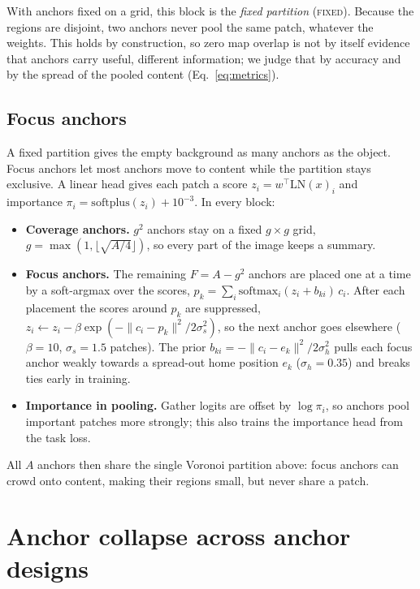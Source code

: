 \documentclass[runningheads]{llncs}
\newcommand{\fixed}{\textsc{fixed}}
\begin{document}
With anchors fixed on a grid, this block is the \emph{fixed partition} (\fixed). Because the
regions are disjoint, two anchors never pool the same patch, whatever the weights. This holds by
construction, so zero map overlap is not by itself evidence that anchors carry useful, different
information; we judge that by accuracy and by the spread of the pooled content (Eq.~\ref{eq:metrics}).

\subsection{Focus anchors}
\label{sec:focus}

A fixed partition gives the empty background as many anchors as the object. Focus anchors let
most anchors move to content while the partition stays exclusive. A linear head gives each patch
a score $z_i=w^{\top}\mathrm{LN}(x)_i$ and importance $\pi_i=\mathrm{softplus}(z_i)+10^{-3}$. In
every block:
\begin{itemize}
\item \textbf{Coverage anchors.} $g^2$ anchors stay on a fixed $g\times g$ grid,
$g=\max(1,\lfloor\sqrt{A/4}\rfloor)$, so every part of the image keeps a summary.
\item \textbf{Focus anchors.} The remaining $F=A-g^2$ anchors are placed one at a time by a
soft-argmax over the scores, $p_k=\sum_i \mathrm{softmax}_i(z_i+b_{ki})\,c_i$. After each
placement the scores around $p_k$ are suppressed,
$z_i\leftarrow z_i-\beta\exp(-\|c_i-p_k\|^2/2\sigma_s^2)$, so the next anchor goes elsewhere
($\beta=10$, $\sigma_s=1.5$ patches). The prior $b_{ki}=-\|c_i-e_k\|^2/2\sigma_h^2$ pulls each
focus anchor weakly towards a spread-out home position $e_k$ ($\sigma_h=0.35$) and breaks ties
early in training.
\item \textbf{Importance in pooling.} Gather logits are offset by $\log\pi_i$, so anchors pool
important patches more strongly; this also trains the importance head from the task loss.
\end{itemize}
All $A$ anchors then share the single Voronoi partition above: focus anchors can crowd onto
content, making their regions small, but never share a patch.

\section{Anchor collapse across anchor designs}
\label{sec:collapse}
\end{document}
